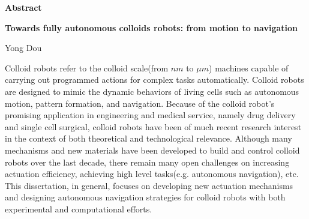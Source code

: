 
\begin{titlepage}
\begin{center}

\vspace*{1\baselineskip}
\textbf{\huge Abstract}

\textbf{Towards fully autonomous  colloids robots: from motion to navigation}

Yong Dou
\end{center}

\hspace{5mm}Colloid robots refer to the colloid scale(from $nm$ to $\mu m$) machines capable of carrying out programmed actions for complex tasks automatically.   Colloid robots are designed to mimic the dynamic behaviors of living cells such as autonomous motion, pattern formation, and navigation. Because of the colloid robot's promising application in engineering and medical service, namely drug delivery and single cell surgical, colloid robots have been of much recent research interest in the context of both theoretical and technological relevance. Although many mechanisms and new materials have been developed to build and control colloid robots over the last decade, there remain many open challenges on increasing actuation efficiency, achieving high level tasks(e.g. autonomous navigation), etc. This dissertation, in general, focuses on developing new actuation mechanisms and designing  autonomous navigation strategies for colloid robots with both experimental and computational efforts.


\end{titlepage}
